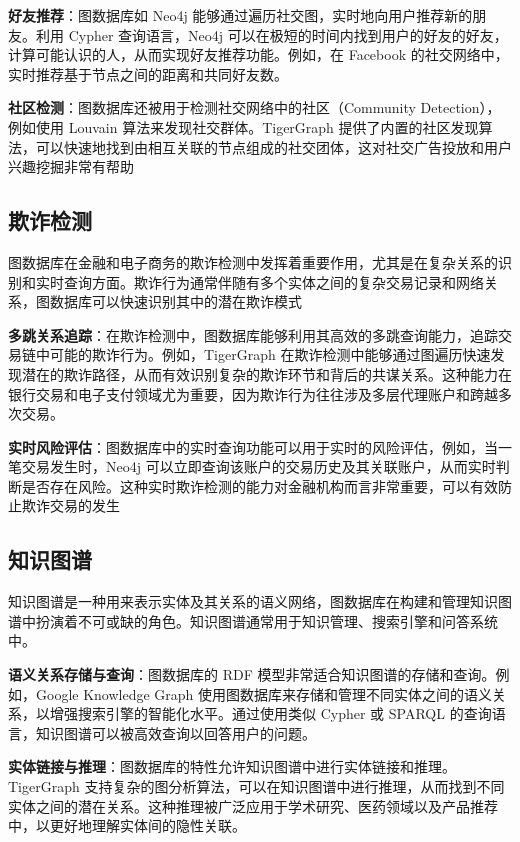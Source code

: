 \documentclass[12pt,hyperref,a4paper,UTF8]{ctexart}
\begin{document}
\textbf{好友推荐}：图数据库如 Neo4j 能够通过遍历社交图，实时地向用户推荐新的朋友。利用 Cypher 查询语言，Neo4j 可以在极短的时间内找到用户的好友的好友，计算可能认识的人，从而实现好友推荐功能。例如，在 Facebook 的社交网络中，实时推荐基于节点之间的距离和共同好友数\cite{ahmad2020missing,wang2022common}。

\textbf{社区检测}：图数据库还被用于检测社交网络中的社区（Community Detection），例如使用 Louvain 算法来发现社交群体。TigerGraph 提供了内置的社区发现算法，可以快速地找到由相互关联的节点组成的社交团体，这对社交广告投放和用户兴趣挖掘非常有帮助\cite{tsitseklis2020scalable,beis2015benchmarking}

\subsection{欺诈检测}
图数据库在金融和电子商务的欺诈检测中发挥着重要作用，尤其是在复杂关系的识别和实时查询方面。欺诈行为通常伴随有多个实体之间的复杂交易记录和网络关系，图数据库可以快速识别其中的潜在欺诈模式

\textbf{多跳关系追踪}：在欺诈检测中，图数据库能够利用其高效的多跳查询能力，追踪交易链中可能的欺诈行为。例如，TigerGraph 在欺诈检测中能够通过图遍历快速发现潜在的欺诈路径，从而有效识别复杂的欺诈环节和背后的共谋关系。这种能力在银行交易和电子支付领域尤为重要，因为欺诈行为往往涉及多层代理账户和跨越多次交易\cite{mao2022financial,cheng2020graph,li2022internet}。

\textbf{实时风险评估}：图数据库中的实时查询功能可以用于实时的风险评估，例如，当一笔交易发生时，Neo4j 可以立即查询该账户的交易历史及其关联账户，从而实时判断是否存在风险。这种实时欺诈检测的能力对金融机构而言非常重要，可以有效防止欺诈交易的发生

\subsection{知识图谱}
知识图谱是一种用来表示实体及其关系的语义网络，图数据库在构建和管理知识图谱中扮演着不可或缺的角色。知识图谱通常用于知识管理、搜索引擎和问答系统中\cite{黄恒琪2019知识图谱研究综述}。

\textbf{语义关系存储与查询}：图数据库的 RDF 模型非常适合知识图谱的存储和查询。例如，Google Knowledge Graph 使用图数据库来存储和管理不同实体之间的语义关系，以增强搜索引擎的智能化水平。通过使用类似 Cypher 或 SPARQL 的查询语言，知识图谱可以被高效查询以回答用户的问题\cite{dong2014knowledge}。

\textbf{实体链接与推理}：图数据库的特性允许知识图谱中进行实体链接和推理。TigerGraph 支持复杂的图分析算法，可以在知识图谱中进行推理，从而找到不同实体之间的潜在关系。这种推理被广泛应用于学术研究、医药领域以及产品推荐中，以更好地理解实体间的隐性关联\cite{徐增林2016知识图谱技术综述}。
\end{document}
